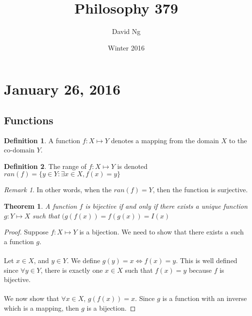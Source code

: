 \documentclass[11pt]{article}
\theoremstyle{plain} %
\newtheorem*{theorem}{Theorem}
\theoremstyle{definition}
\newtheorem*{definition}{Definition} %
\theoremstyle{example}
\theoremstyle{remark}
\newtheorem*{remark}{Remark}
\begin{document}
\title{Philosophy 379}
\author{David Ng}
\date{Winter 2016}
\maketitle

\tableofcontents

\eject


\section{January 26, 2016}
\subsection{Functions}


\begin{definition}
	A function $f: X \mapsto Y$ denotes a mapping from the domain $X$ to the co-domain $Y$.
\end{definition}

\begin{definition}
	The range of $f:X \mapsto Y$ is denoted $ran(f) = \{y \in Y: \exists x \in X, f(x) = y\}$
\end{definition}

\begin{remark}
In other words, when the $ran(f) = Y$, then the function is surjective.
\end{remark}

\begin{theorem}
A function $f$ is bijective if and only if there exists a unique function $g: Y \mapsto X$ such that $(g(f(x)) = f(g(x)) = I(x)$
\end{theorem}

\begin{proof}
Suppose $f: X \mapsto Y$ is a bijection. We need to show that there exists a such a function $g$.
\\
\\Let $x \in X$, and $y \in Y$. We define $g(y) = x \iff f(x) = y$. This is well defined since $\forall y \in Y$, there is exactly one $x \in X$ such that $f(x) = y$ because $f$ is bijective.
\\
\\We now show that $\forall x \in X$, $g(f(x)) = x$. Since $g$ is a function with an inverse which is a mapping, then $g$ is a bijection.

\end{proof}
\end{document}
